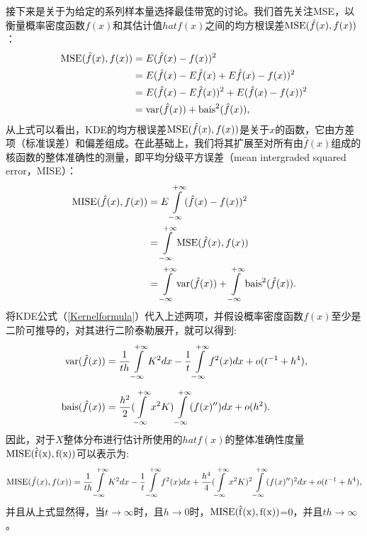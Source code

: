 接下来是关于为给定的系列样本量选择最佳带宽的讨论。我们首先关注MSE，以衡量概率密度函数$f(x)$和其估计值$hat{f}(x)$之间的均方根误差${\rm MSE}(\hat{f}(x), f(x))$：
\begin{align}\label{MSEforrmula}
{\rm MSE}(\hat{f}(x), f(x)) &= E(\hat{f}(x)-f(x))^{2}\notag\\
            &=E(\hat{f}(x) - E\hat{f}(x) +E\hat{f}(x) -f(x))^{2}\notag\\
            &=E(\hat{f}(x) - E\hat{f}(x))^{2}+E(\hat{f}(x) -f(x))^{2}\notag\\
            &={\rm var} (\hat{f}(x)) + {\rm bais}^{2}(\hat{f}(x)),
\end{align}
从上式可以看出，KDE的均方根误差${\rm MSE}(\hat{f}(x), f(x))$是关于$x$的函数，它由方差项（标准误差）和偏差组成。在此基础上，我们将其扩展至对所有由$\hat{f}(x)$组成的核函数的整体准确性的测量，即平均分级平方误差（mean intergraded squared error，MISE）：
\begin{align}\label{MISEforrmula}
{\rm MISE}(\hat{f}(x), f(x)) &= E\int\limits_{-\infty}^{+\infty}(\hat{f}(x)-f(x))^{2}\notag\\
            &=\int\limits_{-\infty}^{+\infty}{\rm MSE}(\hat{f}(x), f(x))\notag\\
            &=\int\limits_{-\infty}^{+\infty}{\rm var} (\hat{f}(x)) + \int\limits_{-\infty}^{+\infty}{\rm bais}^{2}(\hat{f}(x)).
\end{align}
将KDE公式（\eqref{Kernelformula}）代入上述两项，并假设概率密度函数$f(x)$至少是二阶可推导的，对其进行二阶泰勒展开，就可以得到:
\begin{align*}
{\rm var} (\hat{f}(x)) &=\frac{1}{th}\int\limits_{-\infty}^{+\infty}K^2dx-\frac{1}{t}\int\limits_{-\infty}^{+\infty}f^{2}(x)dx + o(t^{-1}+h^{4}),\\[0.5em]
{\rm bais}(\hat{f}(x))  &=\frac{h^{2}}{2}(\int\limits_{-\infty}^{+\infty}x^{2}K)\int\limits_{-\infty}^{+\infty}(f(x)'')dx + o(h^{2}).
\end{align*}
因此，对于$X$整体分布进行估计所使用的$hat{f}(x)$的整体准确性度量$\rm{MISE}(\hat{f}(x),f(x))$可以表示为:
\begin{align}\label{MISEforrmula1}
{\rm MISE}(\hat{f}(x), f(x)) = \frac{1}{th}\int\limits_{-\infty}^{+\infty}K^2dx-\frac{1}{t}\int\limits_{-\infty}^{+\infty}f^{2}(x)dx + \frac{h^{4}}{4}(\int\limits_{-\infty}^{+\infty}x^{2}K)^{2}\int\limits_{-\infty}^{+\infty}(f(x)'')^{2}dx +o(t^{-1}+h^{4}),
\end{align}
并且从上式显然得，当$t\rightarrow \infty$时，且$h\rightarrow 0$时，$\rm{MISE}(\hat{f}(x),f(x))$=0，并且$th\rightarrow \infty$。

